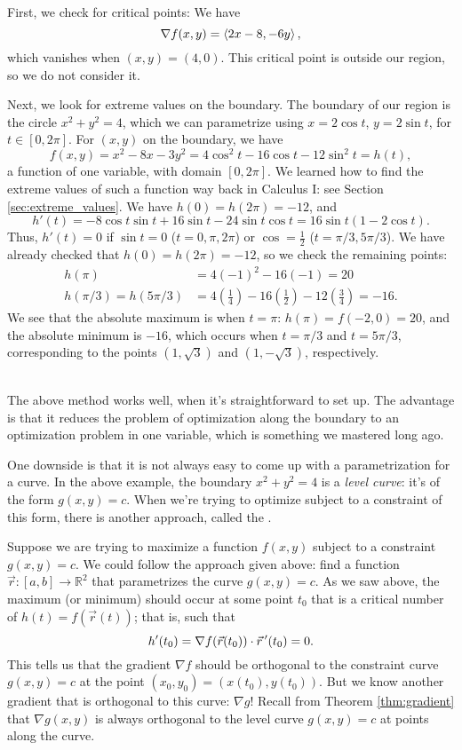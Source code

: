 {
First, we check for critical points: We have
\[
\nabla f(x,y) = \left\langle 2x-8,-6y\right\rangle,
\]
which vanishes when $(x,y) = (4,0)$. This critical point is outside our region, so we do not consider it.

Next, we look for extreme values on the boundary. The boundary of our region is the circle $x^2+y^2=4$, which we can parametrize using $x=2\cos t$, $y=2\sin t$, for $t\in [0,2\pi]$. For $(x,y)$ on the boundary, we have
\[
f(x,y) = x^2-8x-3y^2 = 4\cos^2t-16\cos t-12\sin^2t = h(t),
\]
a function of one variable, with domain $[0,2\pi]$. We learned how to find the extreme values of such a function way back in Calculus I: see Section \ref{sec:extreme_values}. We have $h(0)=h(2\pi)=-12$, and
\[
h'(t) = -8\cos t\sin t+16\sin t-24\sin t\cos t = 16\sin t (1-2\cos t).
\]
Thus, $h'(t)=0$ if $\sin t = 0$ ($t=0,\pi,2\pi$) or $\cos =\frac12$ ($t=\pi/3, 5\pi/3$). We have already checked that $h(0)=h(2\pi)=-12$, so we check the remaining points:
\begin{align*}
h(\pi) &= 4(-1)^2-16(-1) = 20\\
h(\pi/3)=h(5\pi/3) & = 4\left(\frac14\right)-16\left(\frac{1}{2}\right)-12\left(\frac34\right) = -16.
\end{align*}
We see that the absolute maximum is when $t=\pi$: $h(\pi) = f(-2,0)=20$, and the absolute minimum is $-16$, which occurs when $t=\pi/3$ and $t=5\pi/3$, corresponding to the points $(1,\sqrt{3})$ and $(1,-\sqrt{3})$, respectively. 
}\\

The above method works well, when it's straightforward to set up. The advantage is that it reduces the problem of optimization along the boundary to an optimization problem in one variable, which is something we mastered long ago.

One downside is that it is not always easy to come up with a parametrization for a curve. In the above example, the boundary $x^2+y^2=4$ is a \emph{level curve}: it's of the form $g(x,y)=c$. When we're trying to optimize subject to a constraint of this form, there is another approach, called the . 

Suppose we are trying to maximize a function $f(x,y)$ subject to a constraint $g(x,y)=c$. We could follow the approach given above: find a function $\vec{r}: [a,b]\to \mathbb{R}^2$ that parametrizes the curve $g(x,y)=c$. As we saw above, the maximum (or minimum) should occur at some point $t_0$ that is a critical number of $h(t)=f(\vec{r}(t))$; that is, such that 
\[
h'(t_0)=\nabla f(\vec{r}(t_0))\cdot \vec r\, ' (t_0) = 0.
\]
This tells us that the gradient $\nabla f$ should be orthogonal to the constraint curve $g(x,y)=c$ at the point $(x_0,y_0)=(x(t_0),y(t_0))$. But we know another gradient that is orthogonal to this curve: $\nabla g$! Recall from Theorem \ref{thm:gradient} that $\nabla g(x,y)$ is always orthogonal to the level curve $g(x,y)=c$ at points along the curve.

